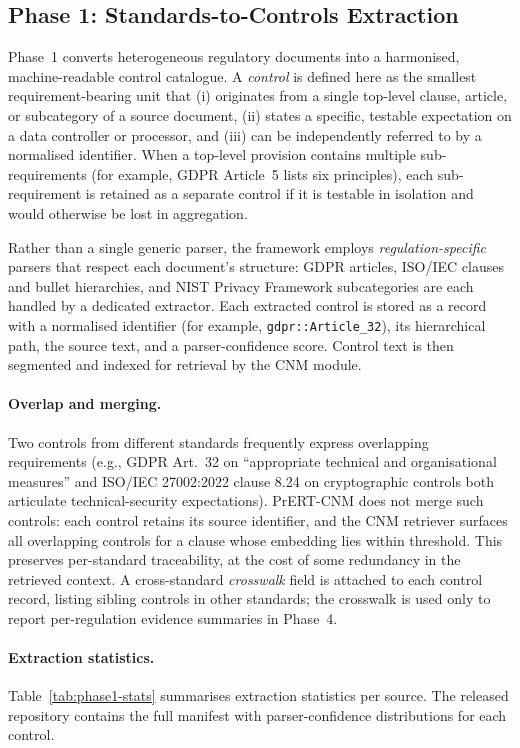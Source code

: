 \documentclass[final,3p,times,twocolumn]{elsarticle}
\begin{document}
	\subsection{Phase 1: Standards-to-Controls Extraction}
	\label{sec:phase1} Phase~1 converts heterogeneous regulatory documents into a harmonised,
	machine-readable control catalogue. A \emph{control} is defined here as the
	smallest requirement-bearing unit that (i) originates from a single top-level
	clause, article, or subcategory of a source document, (ii) states a specific,
	testable expectation on a data controller or processor, and (iii) can be independently
	referred to by a normalised identifier. When a top-level provision contains
	multiple sub-requirements (for example, GDPR Article~5 lists six principles),
	each sub-requirement is retained as a separate control if it is testable in
	isolation and would otherwise be lost in aggregation. 

	Rather than a single generic parser, the framework employs \emph{regulation-specific}
	parsers that respect each document's structure: GDPR articles, ISO/IEC clauses
	and bullet hierarchies, and NIST Privacy Framework subcategories are each handled
	by a dedicated extractor. Each extracted control is stored as a record with a
	normalised identifier (for example, \texttt{gdpr::Article\_32}), its hierarchical
	path, the source text, and a parser-confidence score. Control text is then
	segmented and indexed for retrieval by the CNM module.

	\paragraph{Overlap and merging.}
	Two controls from different standards frequently express overlapping requirements
	(e.g., GDPR Art.~32 on ``appropriate technical and organisational measures'' and
	ISO/IEC 27002:2022 clause 8.24 on cryptographic controls both articulate technical-security
	expectations). PrERT-CNM does not merge such controls: each control retains
	its source identifier, and the CNM retriever surfaces all overlapping controls
	for a clause whose embedding lies within threshold. This preserves per-standard
	traceability, at the cost of some redundancy in the retrieved context. A cross-standard
	\emph{crosswalk} field is attached to each control record, listing sibling
	controls in other standards; the crosswalk is used only to report per-regulation
	evidence summaries in Phase~4. 
	
    \paragraph{Extraction statistics.}
	Table~\ref{tab:phase1-stats} summarises extraction statistics per source. The
	released repository \citep{prertcnm_github} contains the full manifest with parser-confidence
	distributions for each control.
\end{document}

